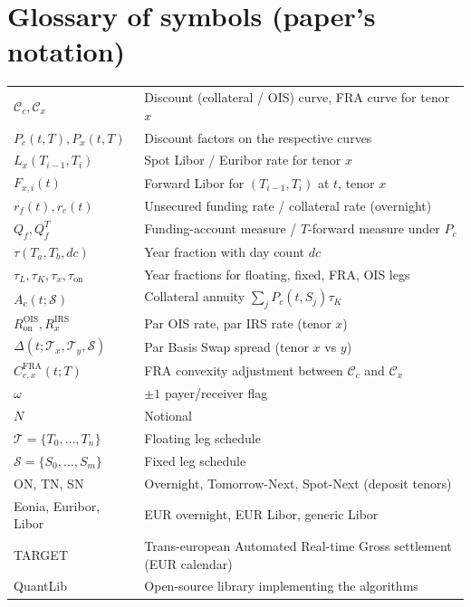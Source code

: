 \documentclass[11pt,a4paper]{article}
\begin{document}
\section{Glossary of symbols (paper's notation)}
\begin{tabular}{@{}p{3cm}p{12cm}@{}}
\toprule
$\mathcal{C}_c, \mathcal{C}_x$ & Discount (collateral / OIS) curve, FRA curve for tenor $x$ \\
$P_c(t, T), P_x(t, T)$       & Discount factors on the respective curves \\
$L_x(T_{i-1}, T_i)$          & Spot Libor / Euribor rate for tenor $x$ \\
$F_{x,i}(t)$                 & Forward Libor for $(T_{i-1}, T_i)$ at $t$, tenor $x$ \\
$r_f(t), r_c(t)$             & Unsecured funding rate / collateral rate (overnight) \\
$Q_f, Q_f^T$                 & Funding-account measure / $T$-forward measure under $P_c$ \\
$\tau(T_a, T_b, dc)$         & Year fraction with day count $dc$ \\
$\tau_L, \tau_K, \tau_x, \tau_{\text{on}}$ & Year fractions for floating, fixed, FRA, OIS legs \\
$A_c(t; \mathcal{S})$        & Collateral annuity $\sum_j P_c(t, S_j) \tau_K$ \\
$R^{\text{OIS}}_{\text{on}}, R^{\text{IRS}}_x$ & Par OIS rate, par IRS rate (tenor $x$) \\
$\Delta(t; \mathcal{T}_x, \mathcal{T}_y, \mathcal{S})$ & Par Basis Swap spread (tenor $x$ vs $y$) \\
$C^{\text{FRA}}_{c,x}(t; T)$ & FRA convexity adjustment between $\mathcal{C}_c$ and $\mathcal{C}_x$ \\
$\omega$                     & $\pm 1$ payer/receiver flag \\
$N$                          & Notional \\
$\mathcal{T} = \{T_0, \ldots, T_n\}$ & Floating leg schedule \\
$\mathcal{S} = \{S_0, \ldots, S_m\}$ & Fixed leg schedule \\
ON, TN, SN                   & Overnight, Tomorrow-Next, Spot-Next (deposit tenors) \\
Eonia, Euribor, Libor        & EUR overnight, EUR Libor, generic Libor \\
TARGET                       & Trans-european Automated Real-time Gross settlement (EUR calendar) \\
QuantLib                     & Open-source library implementing the algorithms \\
\bottomrule
\end{tabular}
\end{document}

